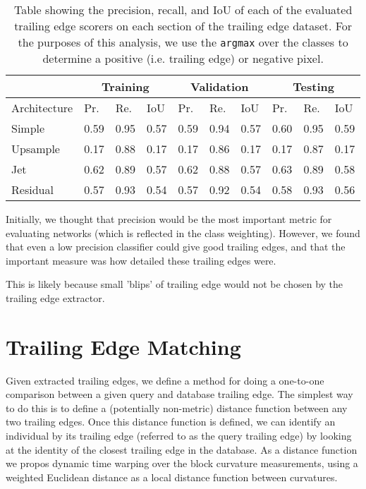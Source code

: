 \begin{table*}[!htb]%
	\centering
	\resizebox{\linewidth}{!}
	{
		\begin{tabular} {l || l | l | l || l | l | l || l | l | l |}
		& \multicolumn{3}{c||}{Training} & \multicolumn{3}{c||}{Validation} & \multicolumn{3}{c|}{Testing} \\
		\hline
		Architecture & Pr. & Re. & IoU & Pr. & Re. & IoU & Pr. & Re. & IoU \\
		\hhline{=#===#===#===|}
		Simple & 0.59 & 0.95 & 0.57 & 0.59 & 0.94 & 0.57 & 0.60 & 0.95 & 0.59 \\
		\hline
		Upsample & 0.17 & 0.88 & 0.17 & 0.17 & 0.86 & 0.17 & 0.17 & 0.87 & 0.17 \\
		\hline
		Jet & 0.62 & 0.89 & 0.57 & 0.62 & 0.88 & 0.57 & 0.63 & 0.89 & 0.58 \\
		\hline
		Residual & 0.57 & 0.93 & 0.54 & 0.57 & 0.92 & 0.54 & 0.58 & 0.93 & 0.56 \\
		\hline
		\end{tabular}
	}
	\caption{Table showing the precision, recall, and IoU of each of the evaluated trailing edge scorers on each section of the trailing edge dataset. For the purposes of this analysis, we use the \texttt{argmax} over the classes to determine a positive (i.e. trailing edge) or negative pixel.}
	\label{tab:te_score_full_analysis}
\end{table*}

Initially, we thought that precision would be the most important metric for evaluating networks (which is reflected in the class weighting).
However, we found that even a low precision classifier could give good trailing edges, and that the important measure was how detailed these trailing edges were.


This is likely because small 'blips' of trailing edge would not be chosen by the trailing edge extractor.

\section{Trailing Edge Matching}

Given extracted trailing edges, we define a method for doing a one-to-one comparison between a given query and database trailing edge.
The simplest way to do this is to define a (potentially non-metric) distance function between any two trailing edges.
Once this distance function is defined, we can identify an individual by its trailing edge (referred to as the query trailing edge) by looking at the identity of the closest trailing edge in the database.
As a distance function we propos dynamic time warping over the block curvature measurements, using a weighted Euclidean distance as a local distance function between curvatures.

